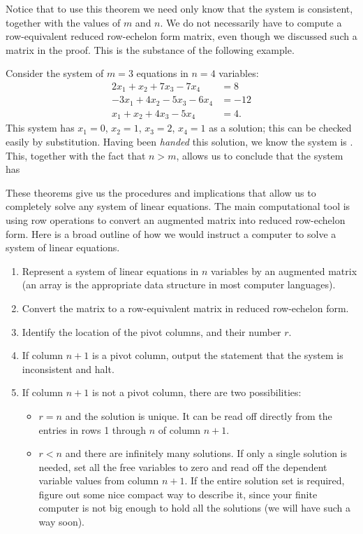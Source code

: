 \documentclass{ximera}
\begin{document}
Notice that to use this theorem we need only know that the system is consistent, together with the values of $m$ and $n$.  We do not necessarily have to compute a row-equivalent reduced row-echelon form matrix, even though we discussed such a matrix in the proof.  This is the substance of the following example.

\begin{example}
Consider the system of $m=3$ equations in $n=4$ variables:
\begin{align*}
2x_1  + x_2 + 7x_3 - 7x_4 &= 8 \\
-3x_1 + 4x_2 -5x_3 - 6x_4 &=  -12 \\
x_1 +x_2 + 4x_3 - 5x_4 &=  4.
\end{align*}
This system has $x_1 = 0$, $x_2 = 1$, $x_3 = 2$, $x_4 = 1$ as a
solution; this can be checked easily by substitution.  Having been
\textit{handed} this solution, we know the system is
.  This,
together with the fact that $n>m$, allows us to conclude that the
system has
\begin{multipleChoice}
\end{multipleChoice}
\end{example}

These theorems give us the procedures and implications that allow us to completely solve any system of linear equations.  The main computational tool is using row operations to convert an augmented matrix into reduced row-echelon form.  Here is a broad outline of how we would instruct a computer to solve a system of linear equations.

\begin{enumerate}
\item Represent a system of linear equations in $n$ variables by an augmented matrix (an array is the appropriate data structure in most computer languages).
\item Convert the matrix to a row-equivalent matrix in reduced row-echelon form.
\item Identify the location of the pivot columns, and their number $r$.
\item If column $n+1$ is a pivot column, output the statement that the system is inconsistent and halt.
\item If column $n+1$ is not a pivot column, there are two possibilities:
\begin{itemize}\item $r=n$ and the solution is unique.  It can be read off directly from the entries in rows 1 through $n$ of column $n+1$.
\item
$r<n$ and there are infinitely many solutions.
If only a single solution is needed, set all the free variables to zero and read off the dependent variable values from column $n+1$.  If the entire solution set is required, figure out some nice compact way to describe it, since your finite computer is not big enough to hold all the solutions (we will have such a way soon).
\end{itemize}
\end{enumerate}
\end{document}
